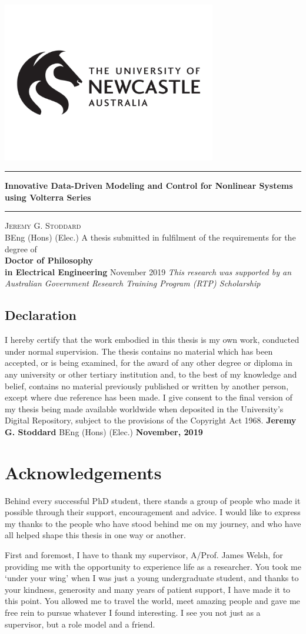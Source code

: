 \documentclass[11pt,twoside]{report}
\author{Jeremy}
\newlength{\drop}%
\newcommand*{\ulogob}{\includegraphics[width=0.7\textwidth]{UONlogo2}}
\newcommand*{\titleUL}{\begingroup
\drop=0.07\textheight
\begin{center}
{\ulogob}\\[\drop]
\rule{\textwidth}{1pt}\par
\vspace{0.5\baselineskip}
{\huge\bfseries Innovative Data-Driven Modeling and Control for Nonlinear Systems using Volterra Series}\\[0.5\baselineskip]
\rule{\textwidth}{1pt}\par
\vfill
{\Large\textsc{Jeremy G. Stoddard}} \\ BEng (Hons) (Elec.) 
\vfill
{A thesis submitted in fulfilment of the requirements for the degree of \\ {\large\bfseries Doctor of Philosophy} \\ {\small\bfseries in Electrical Engineering} }
\vfill
{\large November 2019}
\vfill
{\small \emph{This research was supported by an Australian Government Research Training Program (RTP) Scholarship}}
\end{center}
\endgroup}
\begin{document}
\thispagestyle{plain}
\titleUL
\thispagestyle{plain}
\cleardoublepage
\thispagestyle{plain}
\section*{Declaration}
\thispagestyle{plain}
\begin{minipage}{0.68\textwidth}
I hereby certify that the work embodied in this thesis is my own work, conducted under normal supervision. The thesis contains no material which has been accepted, or is being examined, for the award of any other degree or diploma in any university or other tertiary institution and, to the best of my knowledge and belief, contains no material previously published or written by another person, except where due reference has been made. I give consent to the final version of my thesis being made available worldwide when deposited in the University’s Digital Repository, subject to the provisions of the Copyright Act 1968.
\newline
\newline
\newline
\newline
\newline
\null \hrulefill \newline 
{\Large\textbf{Jeremy G. Stoddard}} \newline
BEng (Hons) (Elec.) \newline
\newline
\textbf{November, 2019}
\end{minipage}

\cleardoublepage
\thispagestyle{plain}

\chapter*{Acknowledgements}
\thispagestyle{plain}


Behind every successful PhD student, there stands a group of people who made it possible through their support, encouragement and advice. I would like to express my thanks to the people who have stood behind me on my journey, and who have all helped shape this thesis in one way or another.

First and foremost, I have to thank my supervisor, A/Prof. James Welsh, for providing me with the opportunity to experience life as a researcher. You took me `under your wing' when I was just a young undergraduate student, and thanks to your kindness, generosity and many years of patient support, I have made it to this point. You allowed me to travel the world, meet amazing people and gave me free rein to pursue whatever I found interesting. I see you not just as a supervisor, but a role model and a friend.
\end{document}
